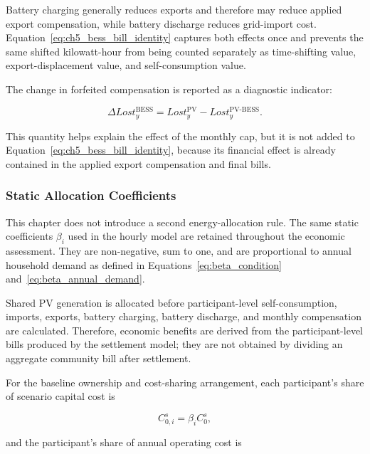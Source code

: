 Battery charging generally reduces exports and therefore may reduce applied export compensation, while battery discharge reduces grid-import cost. Equation~\eqref{eq:ch5_bess_bill_identity} captures both effects once and prevents the same shifted kilowatt-hour from being counted separately as time-shifting value, export-displacement value, and self-consumption value.

The change in forfeited compensation is reported as a diagnostic indicator:

\begin{equation}
\Delta Lost_y^{\mathrm{BESS}}=
Lost_y^{\mathrm{PV}}-Lost_y^{\mathrm{PV\mbox{-}BESS}}.
\label{eq:ch5_reduction_forfeited_compensation}
\end{equation}

This quantity helps explain the effect of the monthly cap, but it is not added to Equation~\eqref{eq:ch5_bess_bill_identity}, because its financial effect is already contained in the applied export compensation and final bills.

\subsubsection{Static Allocation Coefficients}
\label{sec:ch5_static_allocation}

This chapter does not introduce a second energy-allocation rule. The same static coefficients $\beta_i$ used in the hourly model are retained throughout the economic assessment. They are non-negative, sum to one, and are proportional to annual household demand as defined in Equations~\eqref{eq:beta_condition} and~\eqref{eq:beta_annual_demand}.

Shared PV generation is allocated before participant-level self-consumption, imports, exports, battery charging, battery discharge, and monthly compensation are calculated. Therefore, economic benefits are derived from the participant-level bills produced by the settlement model; they are not obtained by dividing an aggregate community bill after settlement.

For the baseline ownership and cost-sharing arrangement, each participant's share of scenario capital cost is

\begin{equation}
C_{0,i}^{s}=\beta_i C_0^{s},
\label{eq:ch5_member_capex_share}
\end{equation}

and the participant's share of annual operating cost is

